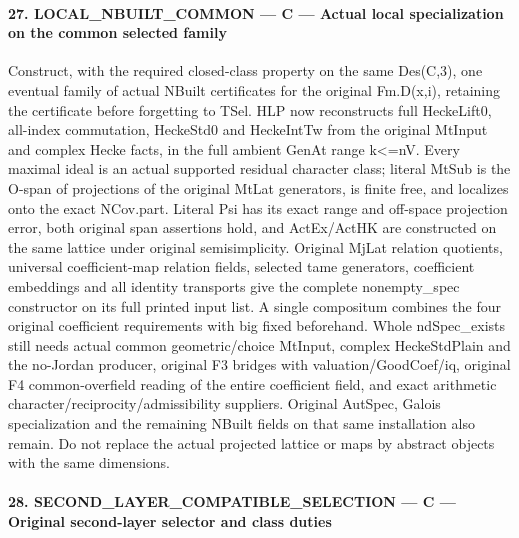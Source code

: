 \paragraph{27. LOCAL\_\allowbreak NBUILT\_\allowbreak COMMON — C — Actual local specialization on the common selected family}

Construct, with the required closed-class property on the same Des(C,3), one eventual family of actual NBuilt certificates for the original Fm.D(x,i), retaining the certificate before forgetting to TSel. HLP now reconstructs full HeckeLift0, all-index commutation, HeckeStd0 and HeckeIntTw from the original MtInput and complex Hecke facts, in the full ambient GenAt range k<=nV. Every maximal ideal is an actual supported residual character class; literal MtSub is the O-span of projections of the original MtLat generators, is finite free, and localizes onto the exact NCov.part. Literal Psi has its exact range and off-space projection error, both original span assertions hold, and ActEx/ActHK are constructed on the same lattice under original semisimplicity. Original MjLat relation quotients, universal coefficient-map relation fields, selected tame generators, coefficient embeddings and all identity transports give the complete nonempty\_\allowbreak spec constructor on its full printed input list. A single compositum combines the four original coefficient requirements with big fixed beforehand. Whole ndSpec\_\allowbreak exists still needs actual common geometric/choice MtInput, complex HeckeStdPlain and the no-Jordan producer, original F3 bridges with valuation/GoodCoef/iq, original F4 common-overfield reading of the entire coefficient field, and exact arithmetic character/reciprocity/admissibility suppliers. Original AutSpec, Galois specialization and the remaining NBuilt fields on that same installation also remain. Do not replace the actual projected lattice or maps by abstract objects with the same dimensions.



\paragraph{28. SECOND\_\allowbreak LAYER\_\allowbreak COMPATIBLE\_\allowbreak SELECTION — C — Original second-layer selector and class duties}

